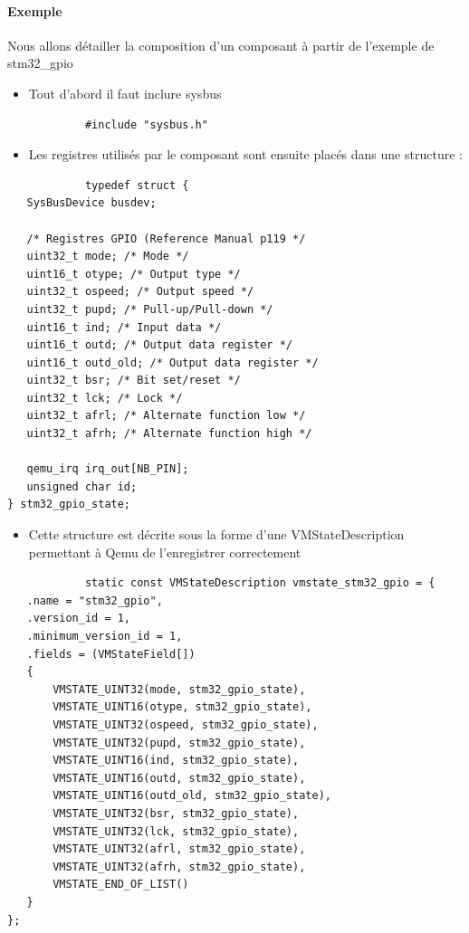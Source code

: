 \documentclass{article}
\begin{document}
			\paragraph{Exemple \\}
			Nous allons détailler la composition d'un composant à partir de l'exemple de stm32\_gpio
			\begin{itemize}
				\item Tout d'abord il faut inclure sysbus 
			\end{itemize}
			\begin{verbatim}
			#include "sysbus.h"
			\end{verbatim}
			\begin{itemize}
				\item Les registres utilisés par le composant sont ensuite placés dans une structure :  
			\end{itemize}
			\begin{verbatim}
			typedef struct {
   SysBusDevice busdev;

   /* Registres GPIO (Reference Manual p119 */
   uint32_t mode; /* Mode */
   uint16_t otype; /* Output type */
   uint32_t ospeed; /* Output speed */
   uint32_t pupd; /* Pull-up/Pull-down */
   uint16_t ind; /* Input data */
   uint16_t outd; /* Output data register */
   uint16_t outd_old; /* Output data register */
   uint32_t bsr; /* Bit set/reset */
   uint32_t lck; /* Lock */
   uint32_t afrl; /* Alternate function low */
   uint32_t afrh; /* Alternate function high */
   
   qemu_irq irq_out[NB_PIN];
   unsigned char id;
} stm32_gpio_state;
			\end{verbatim}
			\begin{itemize}
				\item Cette structure est décrite sous la forme d'une VMStateDescription permettant à Qemu de l'enregistrer correctement 
			\end{itemize}
			\begin{verbatim}
			static const VMStateDescription vmstate_stm32_gpio = {
   .name = "stm32_gpio",
   .version_id = 1,
   .minimum_version_id = 1,
   .fields = (VMStateField[])
   {
       VMSTATE_UINT32(mode, stm32_gpio_state),
       VMSTATE_UINT16(otype, stm32_gpio_state),
       VMSTATE_UINT32(ospeed, stm32_gpio_state),
       VMSTATE_UINT32(pupd, stm32_gpio_state),
       VMSTATE_UINT16(ind, stm32_gpio_state),
       VMSTATE_UINT16(outd, stm32_gpio_state),
       VMSTATE_UINT16(outd_old, stm32_gpio_state),
       VMSTATE_UINT32(bsr, stm32_gpio_state),
       VMSTATE_UINT32(lck, stm32_gpio_state),
       VMSTATE_UINT32(afrl, stm32_gpio_state),
       VMSTATE_UINT32(afrh, stm32_gpio_state),
       VMSTATE_END_OF_LIST()
   }
};
			\end{verbatim}
\end{document}
